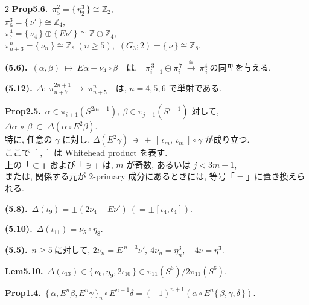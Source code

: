 \documentclass[10pt, leqno]{ltjsarticle}
\newcommand{\toda}[1]{\{\,#1\,\}}              %
\newcommand{\todai}[2][]{\{\,#2\,\}_{#1}}      %
\newcommand{\gen}[1]{\{\,#1\,\}}       %
\numberwithin{equation}{section}
\theoremstyle{plain}
\theoremstyle{definition}
\theoremstyle{remark}
\begin{document}
\begin{paracol}{2}
\noindent
\textbf{Prop5.6.}\
\(\pi^{2}_{5}=\gen{\eta_{2}^{3}}\cong \mathbb Z_{2},\) \\
\(\pi^{3}_{6}=\gen{\nu'}\cong \mathbb Z_{4},\) \\
\(\pi^{4}_{7}=\gen{\nu_{4}}\oplus \gen{E\nu'}\cong \mathbb Z\oplus\mathbb Z_{4},\) \\
\(\pi^{n}_{n+3}=\gen{\nu_{n}}\cong \mathbb Z_{8}\ (n\ge5),\)\qquad
\((G_{3};2)=\gen{\nu}\cong \mathbb Z_{8}.\)

\noindent
\textbf{(5.6).}\
\((\alpha,\beta)\ \longmapsto\ E\alpha+\nu_{4}\circ\beta
\quad\text{は,}\quad
\pi^{\,3}_{i-1}\oplus \pi^{\,7}_{i}\ \xrightarrow{\ \cong\ }\ \pi_{\,i}^{4}
\ \text{の同型を与える. }\)

\noindent
\textbf{(5.12).}\
\(\Delta:\ \pi^{2n+1}_{n+7}\ \longrightarrow\ \pi^{n}_{n+5}
\quad\text{は, }n=4,5,6\text{ で単射である. }\)

\noindent
\textbf{Prop2.5.}\
$\alpha\in\pi_{i+1}(S^{2m+1}), \ \beta\in \pi_{j-1}(S^{i-1})$ 対して, 
\(
\Delta\alpha\ \circ\ \beta\ \subset\ \Delta(\alpha\circ E^2\beta).
\)\\
特に, 任意の $\gamma$ に対し,
\(
\Delta(E^2\gamma)\ \ni\ \pm\,[\,\iota_m,\ \iota_m\,]\circ\gamma
\)
が成り立つ. \\
ここで $[\, ,\,]$ は Whitehead product を表す. \\
上の「$\subset$」および「$\ni$」は, $m$ が奇数, 
あるいは $j<3m-1$, \\
または, 関係する元が \(2\)-primary 成分にあるときには, 
等号「$=$」に置き換えられる. 

\noindent
\textbf{(5.8).}\
\(\Delta(\iota_9)=\pm(2\nu_4-E\nu')  \ (=\pm[\iota_4, \iota_4]) .\)

\noindent
\textbf{(5.10).}\
\(\Delta(\iota_{11})=\nu_5\circ\eta_8 .\)

\noindent
\textbf{(5.5).}\
\(n\ge5\ \text{に対して, } 2\nu_n=E^{\,n-3}\nu',\
4\nu_{n}=\eta_n^{3},\quad 4\nu=\eta^{3}.\)

\noindent
\textbf{Lem5.10.}\
\(
\Delta(\iota_{13})\in\toda{\nu_6,\eta_9,2\iota_{10}}\in\pi_{11}(S^6)/2\pi_{11}(S^6) .
\)

\noindent
\textbf{Prop1.4.}\
\(\todai[n]{\alpha, E^n\beta, E^n\gamma}\circ E^{n+1}\delta
= (-1)^{n+1}(\alpha\circ E^n\toda{\beta, \gamma, \delta})\).



\end{paracol}
\end{document}
